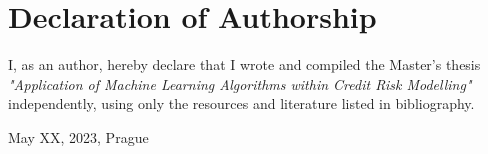 \vfill

\vglue 14cm

\section*{Declaration of Authorship}
I, as an author, hereby declare that I wrote and compiled the Master's thesis {\it{"Application of Machine Learning Algorithms within Credit Risk Modelling"}} independently, using only the resources and literature listed in bibliography.

\bigskip 

\vspace{0.5cm}


\begin{flushleft}
May XX, 2023, Prague 
\end{flushleft}
\vspace{-0.5cm}
\begin{flushright}
\AuthorDP
\end{flushright}

